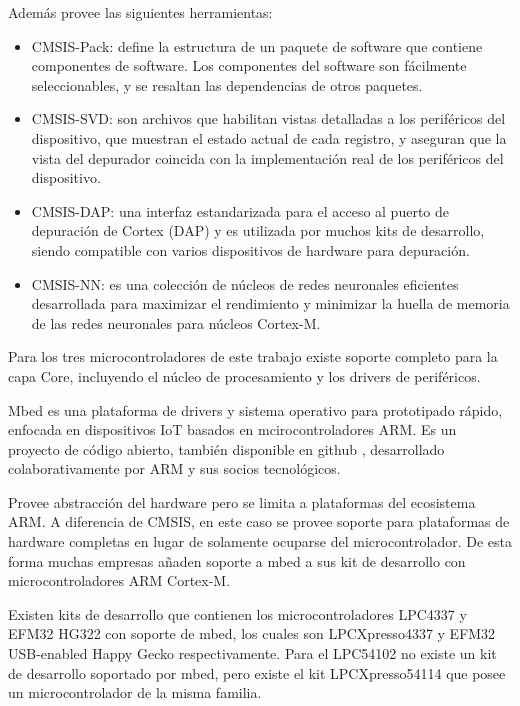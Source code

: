 Además provee las siguientes herramientas:

\begin{itemize}
\item
CMSIS-Pack: define la estructura de un paquete de software que contiene componentes de software. Los componentes del software son fácilmente seleccionables, y se resaltan las dependencias de otros paquetes.
\item
CMSIS-SVD: son archivos que habilitan vistas detalladas a los periféricos del dispositivo, que muestran el estado actual de cada registro, y aseguran que la vista del depurador coincida con la implementación real de los periféricos del dispositivo.
\item
CMSIS-DAP: una interfaz estandarizada para el acceso al puerto de depuración de Cortex (DAP) y es utilizada por muchos kits de desarrollo, siendo compatible con varios dispositivos de hardware para depuración.
\item
CMSIS-NN: es una colección de núcleos de redes neuronales eficientes desarrollada para maximizar el rendimiento y minimizar la huella de memoria de las redes neuronales para núcleos Cortex-M.
\end{itemize}

Para los tres microcontroladores de este trabajo existe soporte completo para la capa Core, incluyendo el núcleo de procesamiento y los drivers de periféricos.


Mbed es una plataforma de drivers y sistema operativo para prototipado rápido, enfocada en dispositivos IoT basados en mcirocontroladores ARM. Es un proyecto de código abierto, también disponible en github \citep{MbedGit}, desarrollado colaborativamente por ARM y sus socios tecnológicos.

Provee abstracción del hardware pero se limita a plataformas del ecosistema ARM. A diferencia de CMSIS, en este caso se provee soporte para plataformas de hardware completas en lugar de solamente ocuparse del microcontrolador. De esta forma muchas empresas añaden soporte a mbed a sus kit de desarrollo con microcontroladores ARM Cortex-M. 

Existen kits de desarrollo que contienen los microcontroladores LPC4337 y EFM32 HG322 con soporte de mbed, los cuales son LPCXpresso4337 \citep{LPCXpresso4337board} y EFM32 USB-enabled Happy Gecko \citep{EFM32HGboard} respectivamente. Para el LPC54102 no existe un kit de desarrollo soportado por mbed, pero existe el kit LPCXpresso54114 \citep{LPCXpresso54114board} que posee un  microcontrolador de la misma familia.

